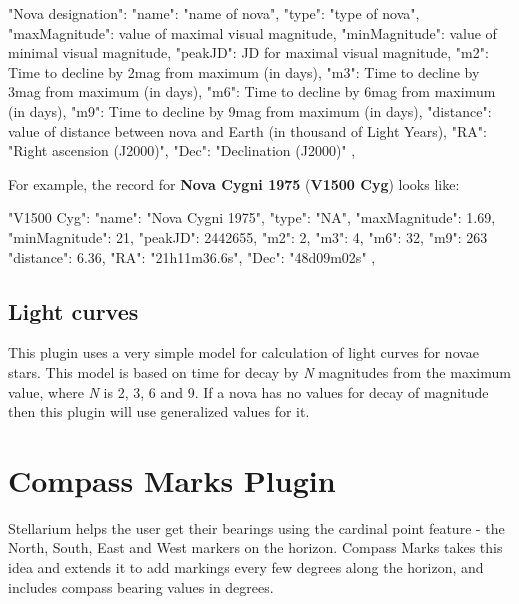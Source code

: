 \begin{configfile}
"Nova designation":
{
    "name": "name of nova",
    "type": "type of nova",
    "maxMagnitude": value of maximal visual magnitude,
    "minMagnitude": value of minimal visual magnitude,
    "peakJD": JD for maximal visual magnitude,
    "m2": Time to decline by 2mag from maximum (in days),
    "m3": Time to decline by 3mag from maximum (in days),
    "m6": Time to decline by 6mag from maximum (in days),
    "m9": Time to decline by 9mag from maximum (in days),
    "distance": value of distance between nova and 
                Earth (in thousand of Light Years),
    "RA": "Right ascension (J2000)",
    "Dec": "Declination (J2000)"
},

\end{configfile}

\newpage
\noindent For example, the record for \textbf{Nova Cygni 1975} (\textbf{V1500 Cyg}) looks like:
\begin{configfile}
"V1500 Cyg":
{
    "name": "Nova Cygni 1975",
    "type": "NA",
    "maxMagnitude": 1.69,
    "minMagnitude": 21,
    "peakJD": 2442655,
    "m2": 2,
    "m3": 4,
    "m6": 32,
    "m9": 263
    "distance": 6.36,
    "RA": "21h11m36.6s",
    "Dec": "48d09m02s"
},
\end{configfile}

\subsection{Light curves}
\label{sec:plugins:BrightNovae:lightcurves}

This plugin uses a very simple model for calculation of light curves for
novae stars. This model is based on time for decay by \emph{N}
magnitudes from the maximum value, where \emph{N} is 2, 3, 6 and 9. If a
nova has no values for decay of magnitude then this plugin will use
generalized values for it.

\section{Compass Marks Plugin}
\label{sec:plugins:CompassMarks}


Stellarium helps the user get their bearings using the cardinal point
feature - the North, South, East and West markers on the horizon.
Compass Marks takes this idea and extends it to add markings every few
degrees along the horizon, and includes compass bearing values in
degrees.

